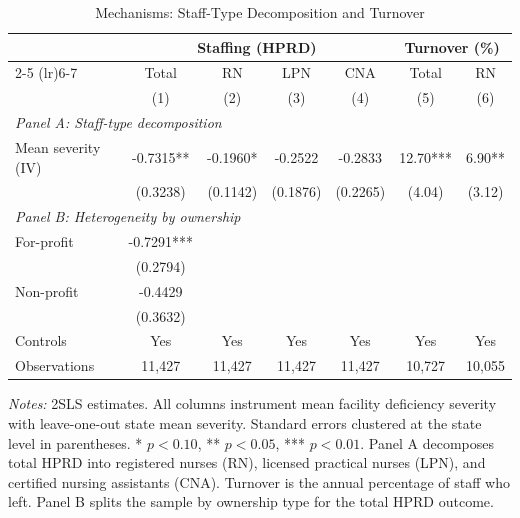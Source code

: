 \begin{table}[H]
\centering
\caption{Mechanisms: Staff-Type Decomposition and Turnover}
\label{tab:mechanisms}
\begin{threeparttable}
\begin{tabular}{lcccccc}
\toprule
& \multicolumn{4}{c}{Staffing (HPRD)} & \multicolumn{2}{c}{Turnover (\%)} \\
\cmidrule(lr){2-5} \cmidrule(lr){6-7}
& Total & RN & LPN & CNA & Total & RN \\
& (1) & (2) & (3) & (4) & (5) & (6) \\
\midrule
\multicolumn{7}{l}{\textit{Panel A: Staff-type decomposition}} \\[3pt]
Mean severity (IV) & -0.7315** & -0.1960* & -0.2522 & -0.2833 & 12.70*** & 6.90** \\
& (0.3238) & (0.1142) & (0.1876) & (0.2265) & (4.04) & (3.12) \\[6pt]
\midrule
\multicolumn{7}{l}{\textit{Panel B: Heterogeneity by ownership}} \\[3pt]
For-profit & -0.7291*** & & & & & \\
& (0.2794) & & & & & \\
Non-profit & -0.4429 & & & & & \\
& (0.3632) & & & & & \\[6pt]
\midrule
Controls & Yes & Yes & Yes & Yes & Yes & Yes \\
Observations & 11,427 & 11,427 & 11,427 & 11,427 & 10,727 & 10,055 \\
\bottomrule
\end{tabular}
\begin{tablenotes}[flushleft]
\small
\item \textit{Notes:} 2SLS estimates. All columns instrument mean facility deficiency severity with
leave-one-out state mean severity. Standard errors clustered at the state level in parentheses.
* $p<0.10$, ** $p<0.05$, *** $p<0.01$.
Panel A decomposes total HPRD into registered nurses (RN), licensed practical nurses (LPN), and
certified nursing assistants (CNA). Turnover is the annual percentage of staff who left.
Panel B splits the sample by ownership type for the total HPRD outcome.
\end{tablenotes}
\end{threeparttable}
\end{table}
